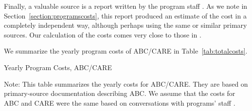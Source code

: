 \noindent Finally, a valuable source is a report written by the program staff \citet{FPG_1979_Progress-Report}. As we note in Section~\ref{section:programscosts}, this report produced an estimate of the cost in a completely independent way, although perhaps using the same or similar primary sources. Our calculation of the costs comes very close to those in \citet{FPG_1979_Progress-Report}.

\noindent We summarize the yearly program costs of ABC/CARE in Table~\ref{tab:totalcosts}.

\begin{table}[H]
\centering
\begin{threeparttable}
\caption{Yearly Program Costs, ABC/CARE} \label{tab:totalcosts}
\footnotesize

\begin{tablenotes}
\footnotesize
\item Note: This table summarizes the yearly costs for ABC/CARE. They are based on primary-source documentation describing ABC. We assume that the costs for ABC and CARE were the same based on conversations with programs' staff \citep{projectcare2014interviews,abc2014-2015interviews}.
\end{tablenotes}
\end{threeparttable}
\end{table}